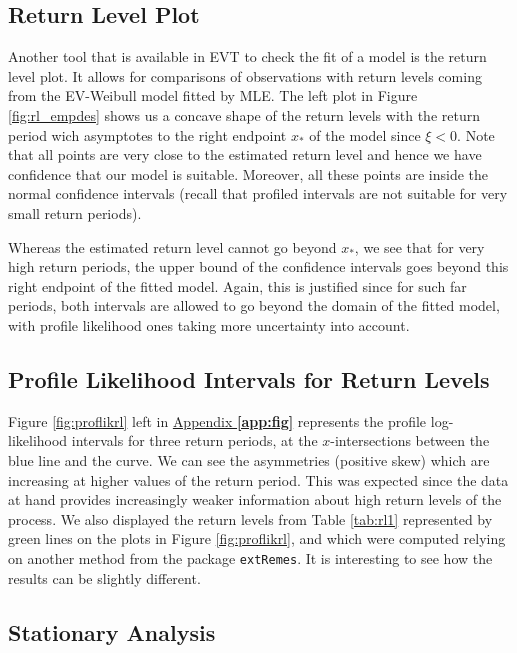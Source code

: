 \subsection*{Return Level Plot}

Another tool that is available in EVT to check the fit of a model is the return level plot. It allows for comparisons of
observations with return levels coming from the EV-Weibull model fitted by MLE. The left plot in
Figure \ref{fig:rl_empdes} shows us a concave shape of the return levels with the return period wich asymptotes to the right endpoint $x_*$ of the model since $\xi<0$. Note that all points are very close to the estimated return level and hence we have confidence that our model
is suitable. Moreover, all these points are inside the normal confidence intervals (recall that profiled intervals are not suitable for very small return periods).

Whereas the estimated return level cannot go beyond $x_*$, we see that for very high return periods, the upper bound of the confidence intervals goes beyond this right endpoint of the fitted model. Again, this is justified since for such far periods, both intervals are allowed to go beyond the domain of the fitted model, with profile likelihood ones taking more uncertainty into account.



\subsection*{Profile Likelihood Intervals for Return Levels}

Figure \ref{fig:proflikrl} left in  \hyperref[app:fig]{Appendix \textbf{\ref{app:fig}}} represents the profile log-likelihood intervals for three return periods, at the $x$-intersections between the blue line and the curve. We
can see the asymmetries (positive skew) which are increasing at higher
values of the return period. This was expected since the data at hand provides increasingly weaker information about high return levels of the process. We also displayed the return levels
from Table \ref{tab:rl1}  represented by green lines on the plots in Figure \ref{fig:proflikrl}, and which were computed relying on another method from the
package \texttt{extRemes}. It is interesting to see how the results can be slightly different.


\subsection{Stationary Analysis}

